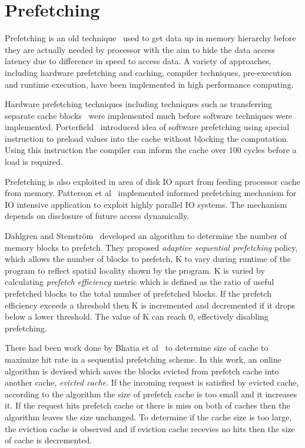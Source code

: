 \section{Prefetching}
Prefetching is an old technique~\cite{anacker68}\cite{Smith1982}\cite{Vanderwiel2000}
used to get data up in memory hierarchy before they are actually needed by processor
with the aim to hide the data access latency due to difference in speed to access
data. A variety of approaches, including hardware prefetching and caching, compiler
techniques, pre-execution and runtime execution, have been implemented in high
performance computing.

Hardware prefetching techniques including techniques such as transferring separate
cache blocks~\cite{Smith1978} were implemented much before software techniques were
implemented. Porterfield~\cite{Porterfield1989} introduced idea of software prefetching
using special instruction to preload values into the cache without blocking the
computation. Using this instruction the compiler can inform the cache over 100
cycles before a load is required.

Prefetching is also exploited in area of disk IO apart from feeding processor cache
from memory. Patterson et al~\cite{Patterson1994} implemented informed prefetching
mechanism for IO intensive application to exploit highly parallel IO systems. The
mechanism depends on disclosure of future access dynamically.

Dahlgren and Stenström~\cite{Dahlgren1993} developed an algorithm to determine the
number of memory blocks to prefetch. They proposed
\textit{adaptive sequential prefetching} policy, which allows the number of blocks
to prefetch, K to vary during runtime of the program to reflect spatial locality
shown by the program. K is varied by calculating \textit{prefetch efficiency} metric
which is defined as the ratio of useful prefetched blocks to the total number of
prefetched blocks. If the prefetch efficiency exceeds a threshold then K is
incremented and decremented if it drops below a lower threshold. The value of K
can reach 0, effectively disabling prefetching.

There had been work done by Bhatia et al~\cite{Bhatia2010} to determine size of
cache to maximize hit rate in a sequential prefetching scheme. In this work, an
online algorithm is devised which saves the blocks evicted from prefetch cache
into another cache, \textit{evicted cache}. If the incoming request is satisfied
by evicted cache, according to the algorithm the size of prefetch cache is too
small and it increases it. If the request hits prefetch cache or there is miss
on both of caches then the algorithm leaves the size unchanged. To determine if
the cache size is too large, the eviction cache is observed and if eviction cache
recevies no hits then the size of cache is decremented.